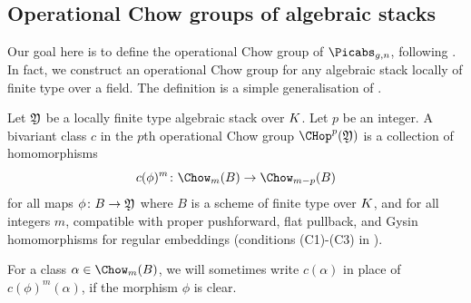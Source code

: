 

\subsection{Operational Chow groups of algebraic stacks}\label{ssec:Chopstacks}
Our goal here is to define the operational Chow group of $\Picabs_{g,n}$, following \cite[Chapter 17]{Fulton1984Intersection-th}.
In fact, we construct an operational Chow group for any algebraic stack locally of finite type over a field.
The definition is a simple generalisation of  \cite{Fulton1984Intersection-th}.

\begin{definition}
\notready
    Let $\frak Y$ be a locally finite type algebraic stack over ${K}$. Let $p$ be an integer. A bivariant class $c$ in the $p$th operational Chow group $\CHop^p(\frak Y)$ is a collection of  homomorphisms
\[c(\phi)^{m}\colon \Chow_m(B) \to \Chow_{m-p}(B)\]
for all maps $\phi \colon B \to \frak Y$ where $B$ is a scheme of finite type over ${K}$, and for all integers $m$, compatible with proper pushforward, flat pullback, and Gysin homomorphisms for regular embeddings (conditions (C1)-(C3) in \cite[Section 17.1]{Fulton1984Intersection-th}).
\end{definition}
For a class $\alpha \in \Chow_m(B)$, we will sometimes write $c(\alpha)$ in place of $c(\phi)^m(\alpha)$, if the morphism $\phi$ is clear.

